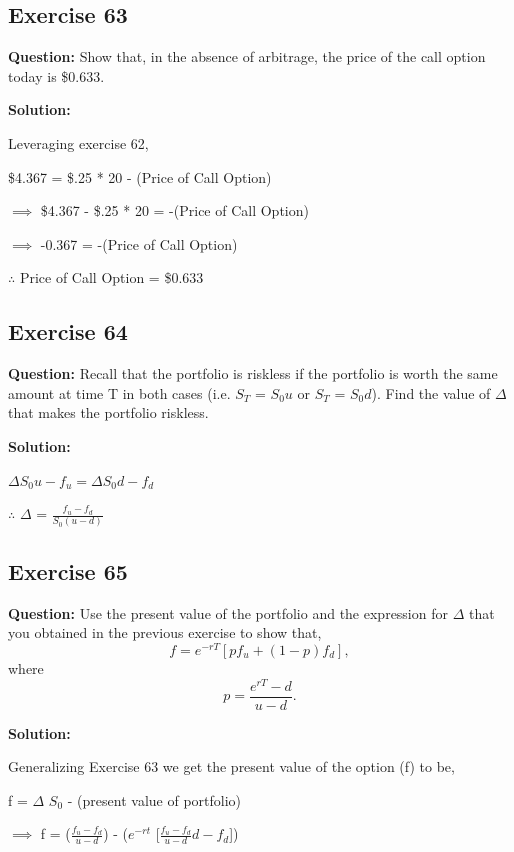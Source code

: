 \documentclass{article}
\begin{document}
\subsection*{Exercise 63}
\textbf{Question:} Show that, in the absence of arbitrage, the price of the call option today is \$0.633.

\textbf{Solution:}

Leveraging exercise 62,

\$4.367 = \$.25 * 20 - (Price of Call Option)

$\implies$ \$4.367 - \$.25 * 20  = -(Price of Call Option)

$\implies$ -0.367 = -(Price of Call Option)

$\therefore$ Price of Call Option = \$0.633


\subsection*{Exercise 64}
\textbf{Question:} Recall that the portfolio is riskless if the portfolio is worth the same amount at time T in both
cases (i.e. $S_T$ = $S_{0}u$ or $S_T$ = $S_{0}d$). Find the value of $\Delta$ that makes the portfolio riskless.

\textbf{Solution:}

$\Delta S_{0}u - f_u = \Delta S_{0}d - f_d$

$\therefore$ $\Delta$ = $\frac{f_u - f_d}{S_0(u - d)}$

\subsection*{Exercise 65}
\textbf{Question:} Use the present value of the portfolio and the expression for $\Delta$ that you obtained in the previous exercise to show that, $$f=e^{-rT}\left[pf_u+(1-p)f_d\right],$$ where $$p=\frac{e^{rT}-d}{u-d}.$$

\textbf{Solution:}

Generalizing Exercise 63 we get the present value of the option (f) to be,

\vspace{\baselineskip}

f = $\Delta$ $S_0$ - (present value of portfolio)

\vspace{\baselineskip}

$\implies$ f = ($\frac{f_u - f_d}{u - d}$) - ($e^{-rt}$ [$\frac{f_u - f_d}{u - d}$$d - f_d$])

\vspace{\baselineskip}
\end{document}
